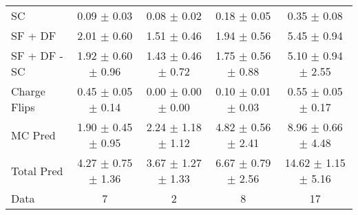 \begin{tabular}{l|cccc}
                                 SC &  0.09 $\pm$  0.03 &  0.08 $\pm$  0.02 &  0.18 $\pm$  0.05 &  0.35 $\pm$  0.08 \\
                            SF + DF &  2.01 $\pm$  0.60 &  1.51 $\pm$  0.46 &  1.94 $\pm$  0.56 &  5.45 $\pm$  0.94 \\
\hline
                       SF + DF - SC &  1.92 $\pm$  0.60 $\pm$  0.96 &  1.43 $\pm$  0.46 $\pm$  0.72 &  1.75 $\pm$  0.56 $\pm$  0.88 &  5.10 $\pm$  0.94 $\pm$  2.55 \\
\hline\hline
                       Charge Flips &  0.45 $\pm$  0.05 $\pm$  0.14 &  0.00 $\pm$  0.00 $\pm$  0.00 &  0.10 $\pm$  0.01 $\pm$  0.03 &  0.55 $\pm$  0.05 $\pm$  0.17 \\
\hline
                            MC Pred &  1.90 $\pm$  0.45 $\pm$  0.95 &  2.24 $\pm$  1.18 $\pm$  1.12 &  4.82 $\pm$  0.56 $\pm$  2.41 &  8.96 $\pm$  0.66 $\pm$  4.48 \\
\hline
                         Total Pred &  4.27 $\pm$  0.75 $\pm$  1.36 &  3.67 $\pm$  1.27 $\pm$  1.33 &  6.67 $\pm$  0.79 $\pm$  2.56 & 14.62 $\pm$  1.15 $\pm$  5.16 \\
\hline\hline
                               Data &     7 &     2 &     8 &    17 \\
\hline\hline
\end{tabular}

